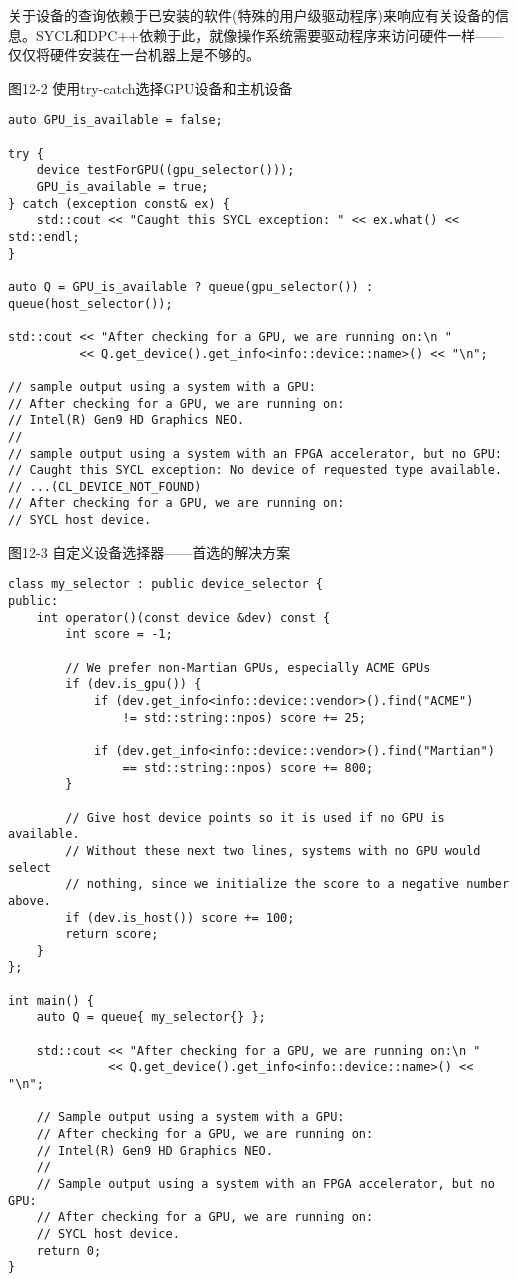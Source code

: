 \begin{tcolorbox}[colback=red!5!white,colframe=red!75!black]
关于设备的查询依赖于已安装的软件(特殊的用户级驱动程序)来响应有关设备的信息。SYCL和DPC++依赖于此，就像操作系统需要驱动程序来访问硬件一样——仅仅将硬件安装在一台机器上是不够的。
\end{tcolorbox}

\hspace*{\fill} \par %
图12-2 使用try-catch选择GPU设备和主机设备
\begin{lstlisting}[caption={}]
auto GPU_is_available = false;

try {
	device testForGPU((gpu_selector()));
	GPU_is_available = true;
} catch (exception const& ex) {
	std::cout << "Caught this SYCL exception: " << ex.what() << std::endl;
}

auto Q = GPU_is_available ? queue(gpu_selector()) : queue(host_selector());

std::cout << "After checking for a GPU, we are running on:\n "
	  	  << Q.get_device().get_info<info::device::name>() << "\n";

// sample output using a system with a GPU:
// After checking for a GPU, we are running on:
// Intel(R) Gen9 HD Graphics NEO.
// 
// sample output using a system with an FPGA accelerator, but no GPU:
// Caught this SYCL exception: No device of requested type available.
// ...(CL_DEVICE_NOT_FOUND)
// After checking for a GPU, we are running on:
// SYCL host device.
\end{lstlisting}

\hspace*{\fill} \par %
图12-3 自定义设备选择器——首选的解决方案
\begin{lstlisting}[caption={}]
class my_selector : public device_selector {
public:
	int operator()(const device &dev) const {
		int score = -1;
		
		// We prefer non-Martian GPUs, especially ACME GPUs
		if (dev.is_gpu()) {
			if (dev.get_info<info::device::vendor>().find("ACME")
				!= std::string::npos) score += 25;
			
			if (dev.get_info<info::device::vendor>().find("Martian")
				== std::string::npos) score += 800;
		}
	
		// Give host device points so it is used if no GPU is available.
		// Without these next two lines, systems with no GPU would select
		// nothing, since we initialize the score to a negative number above.
		if (dev.is_host()) score += 100;
		return score;
	}
};

int main() {
	auto Q = queue{ my_selector{} };
	
	std::cout << "After checking for a GPU, we are running on:\n "
			  << Q.get_device().get_info<info::device::name>() << "\n";
			  
	// Sample output using a system with a GPU:
	// After checking for a GPU, we are running on:
	// Intel(R) Gen9 HD Graphics NEO.
	// 
	// Sample output using a system with an FPGA accelerator, but no GPU:
	// After checking for a GPU, we are running on:
	// SYCL host device.
	return 0;
}
\end{lstlisting}

